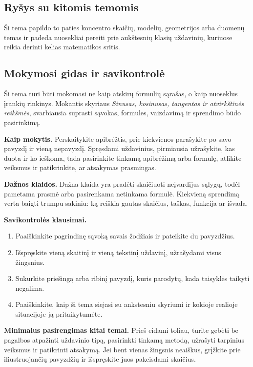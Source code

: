 \subsection{Ryšys su kitomis temomis}
Ši tema papildo to paties koncentro skaičių, modelių, geometrijos arba duomenų temas ir padeda nuosekliai pereiti prie aukštesnių klasių uždavinių, kuriuose reikia derinti kelias matematikos sritis.

\subsection{Mokymosi gidas ir savikontrolė}

Ši tema turi būti mokomasi ne kaip atskirų formulių sąrašas, o kaip nuoseklus įrankių rinkinys. Mokantis skyriaus \textit{Sinusas, kosinusas, tangentas ir atvirkštinės reikšmės}, svarbiausia suprasti sąvokas, formules, vaizdavimą ir sprendimo būdo pasirinkimą.

\textbf{Kaip mokytis.} Perskaitykite apibrėžtis, prie kiekvienos parašykite po savo pavyzdį ir vieną nepavyzdį. Spręsdami uždavinius, pirmiausia užrašykite, kas duota ir ko ieškoma, tada pasirinkite tinkamą apibrėžimą arba formulę, atlikite veiksmus ir patikrinkite, ar atsakymas prasmingas.

\textbf{Dažnos klaidos.} Dažna klaida yra pradėti skaičiuoti neįvardijus sąlygų, todėl pametama prasmė arba pasirenkama netinkama formulė. Kiekvieną sprendimą verta baigti trumpu sakiniu: ką reiškia gautas skaičius, taškas, funkcija ar išvada.

\textbf{Savikontrolės klausimai.}
\begin{enumerate}[label=\arabic*.]
\item Paaiškinkite pagrindinę sąvoką savais žodžiais ir pateikite du pavyzdžius.
\item Išspręskite vieną skaitinį ir vieną tekstinį uždavinį, užrašydami visus žingsnius.
\item Sukurkite priešingą arba ribinį pavyzdį, kuris parodytų, kada taisyklės taikyti negalima.
\item Paaiškinkite, kaip ši tema siejasi su ankstesniu skyriumi ir kokioje realioje situacijoje ją pritaikytumėte.
\end{enumerate}

\textbf{Minimalus pasirengimas kitai temai.} Prieš eidami toliau, turite gebėti be pagalbos atpažinti uždavinio tipą, pasirinkti tinkamą metodą, užrašyti tarpinius veiksmus ir patikrinti atsakymą. Jei bent vienas žingsnis neaiškus, grįžkite prie iliustruojančių pavyzdžių ir išspręskite juos pakeisdami skaičius.

